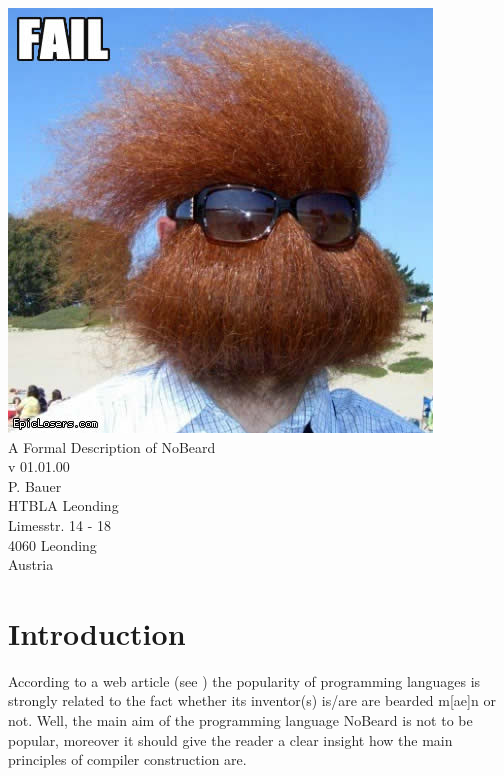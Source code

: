 \documentclass[11pt]{report}
\author{P. Bauer}
\date{V.\_01.00.00}                                           %
\newcommand{\leongage}{NoBeard}
\begin{document}
\begin{titlepage}
\begin{center}
\includegraphics[scale=0.3]{no_beard_1.jpg} \\[2em]
{\Huge A Formal Description of \leongage} \\[1em]
{\large v 01.01.00} \\[2em]
{\Large P. Bauer} \\[1em]
HTBLA Leonding \\
Limesstr. 14 - 18 \\
4060 Leonding \\
Austria
\end{center}
\end{titlepage}

\tableofcontents
\chapter{Introduction}
According to a web article (see \cite{khason_computer_2008}) the popularity of programming languages is strongly related to the fact whether its inventor(s) is/are are bearded m[ae]n or not. Well, the main aim of the programming language \leongage{} is not to be popular,
moreover it should give the reader a clear insight how the main principles of compiler construction are.
\end{document}

